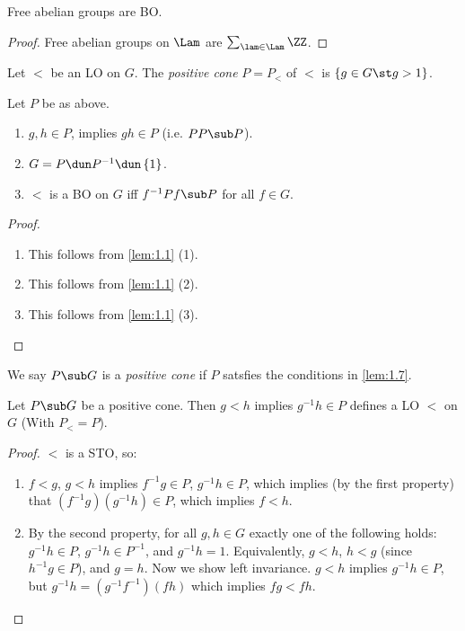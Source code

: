 \begin{cor}
Free abelian groups are BO.
\label{cor:1.6}
\end{cor}

\begin{proof}
Free abelian groups on $\Lam$ are $\sum_{\lam \in \Lam} \ZZ$.
\end{proof}

Let $<$ be an LO on $G$.
The \emph{positive cone} $P = P_{<}$ of $<$ is $\left\{g\in G\st g > 1\right\}$.

\begin{lem}
Let $P$ be as above.
\begin{enumerate}
\item $g,h\in P$, implies $gh\in P$ (i.e. $PP\sub P$).
\item $G = P\dun P^{-1} \dun\left\{1\right\}$.
\item $<$ is a BO on $G$ iff $f^{-1} P f \sub P$ for all $f\in G$.
\end{enumerate}
\label{lem:1.7}
\end{lem}

\begin{proof}
\begin{enumerate}
\item This follows from \cref{lem:1.1} (1).
\item This follows from \cref{lem:1.1} (2).
\item This follows from \cref{lem:1.1} (3).
\end{enumerate}
\end{proof}

We say $P\sub G$ is a \emph{positive cone} if $P$ satsfies the conditions in
\cref{lem:1.7}.

\begin{lem}
Let $P\sub G$ be a positive cone. Then $g < h$ implies $g^{-1} h \in P$ defines a LO
$<$ on $G$ (With $P_< = P$).
\label{lem:1.8}
\end{lem}

\begin{proof}
$<$ is a STO, so:
\begin{enumerate}[label = (\iii)]
\item $f < g$, $g < h$ implies $f^{-1} g\in P$, $g^{-1} h\in P$, which implies (by the
first property) that $\left(f^{-1} g\right)\left(g^{-1} h\right)\in P$, which implies $f <
h$.

\item By the second property, for all $g,h\in G$ exactly one of the following holds:
$g^{-1} h\in P$, $g^{-1} h \in P^{-1}$, and $g^{-1}h = 1$.
Equivalently, $g<h$, $h < g$ (since $h^{-1} g\in P$), and $g = h$.
Now we show left invariance. $g < h$ implies $g^{-1} h\in P$, but $g^{-1} h = \left(g^{-1}
f^{-1}\right)\left(fh\right)$ which implies $fg < fh$.
\end{enumerate}
\end{proof}

